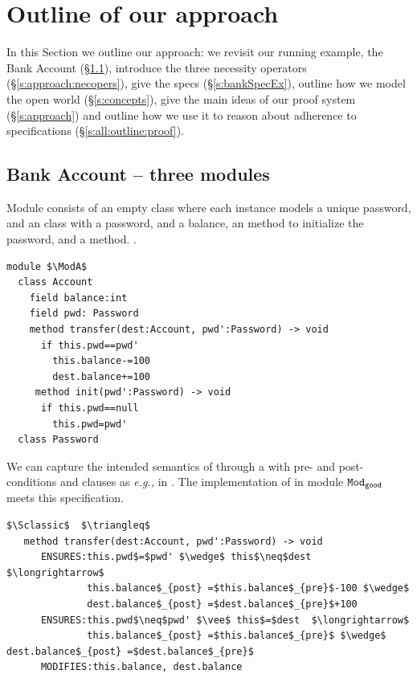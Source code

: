 

\section{Outline of our approach}
\label{s:outline}
 
In this Section we outline our approach:  
we  revisit  our running example, the Bank Account (\S\ref{s:bank}),  
introduce the three necessity operators (\S \ref{s:approach:necopers}),  give 
the \Nec specs (\S \ref{s:bankSpecEx}),
   outline how we model the open world (\S\ref{s:concepts}), 
give the main ideas of our proof system (\S\ref{s:approach})
and   outline 
how we use it to reason 
about adherence to \Nec specifications  (\S\ref{s:all:outline:proof}).
 

 \subsection{Bank Account -- three modules}
\label{s:bank}
  
Module \ModA consists of an empty 
 class where each instance models a unique password, and an   class with a password, and a balance, an  method to 
initialize the password, and 
a
 method. 
.
%
% 
\begin{lstlisting}[mathescape=true, language=Chainmail,xleftmargin=2em,frame=lines,framexleftmargin=1.5em]
module $\ModA$
  class Account
    field balance:int 
    field pwd: Password
    method transfer(dest:Account, pwd':Password) -> void
      if this.pwd==pwd'
        this.balance-=100
        dest.balance+=100
     method init(pwd':Password) -> void
      if this.pwd==null
        this.pwd=pwd'
  class Password
\end{lstlisting}
%
\noindent 
We can capture the intended semantics of     
through  {a}  \funcSpec with pre- and post- conditions and  clauses as \emph{e.g.,} in \citeauthor{Leavens-etal07,dafny13}.
The implementation of   in module  ${\texttt{Mod}}_{{\texttt{good}}}$ meets
this specification.

\begin{lstlisting}[mathescape=true,xleftmargin=2em,frame=lines,framexleftmargin=1.5em, language=Chainmail]
$\Sclassic$  $\triangleq$
   method transfer(dest:Account, pwd':Password) -> void  
      ENSURES:this.pwd$=$pwd' $\wedge$ this$\neq$dest  $\longrightarrow$  
              this.balance$_{post} =$this.balance$_{pre}$-100 $\wedge$ 
              dest.balance$_{post} =$dest.balance$_{pre}$+100
      ENSURES:this.pwd$\neq$pwd' $\vee$ this$=$dest  $\longrightarrow$ 
              this.balance$_{post} =$this.balance$_{pre}$ $\wedge$ dest.balance$_{post} =$dest.balance$_{pre}$ 
      MODIFIES:this.balance, dest.balance        
\end{lstlisting}
 
